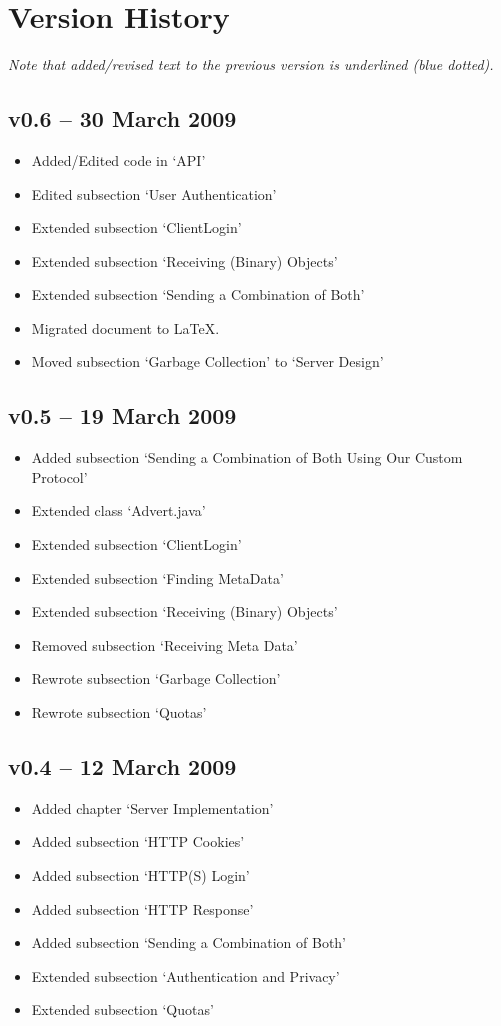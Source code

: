 \section{Version History}
\emph{Note that added/revised text to the previous version is underlined (blue
dotted).}

\subsection*{v0.6 -- 30 March 2009}
\begin{itemize}
  \item Added/Edited code in `API' 
  \item Edited subsection `User Authentication'
  \item Extended subsection `ClientLogin'
  \item Extended subsection `Receiving (Binary) Objects'
  \item Extended subsection `Sending a Combination of Both'
  \item Migrated document to \LaTeX.
  \item Moved subsection `Garbage Collection' to `Server Design'
\end{itemize}

\subsection*{v0.5 -- 19 March 2009}
\begin{itemize}
  \item Added subsection `Sending a Combination of Both Using Our Custom Protocol'
  \item Extended class `Advert.java'
  \item Extended subsection `ClientLogin'
  \item Extended subsection `Finding MetaData'
  \item Extended subsection `Receiving (Binary) Objects'
  \item Removed subsection `Receiving Meta Data'
  \item Rewrote subsection `Garbage Collection'
  \item Rewrote subsection `Quotas'
\end{itemize}

\subsection*{v0.4 -- 12 March 2009}
\begin{itemize}
  \item Added chapter `Server Implementation'
  \item Added subsection `HTTP Cookies'
  \item Added subsection `HTTP(S) Login'
  \item Added subsection `HTTP Response'
  \item Added subsection `Sending a Combination of Both'
  \item Extended subsection `Authentication and Privacy'
  \item Extended subsection `Quotas'
\end{itemize}


